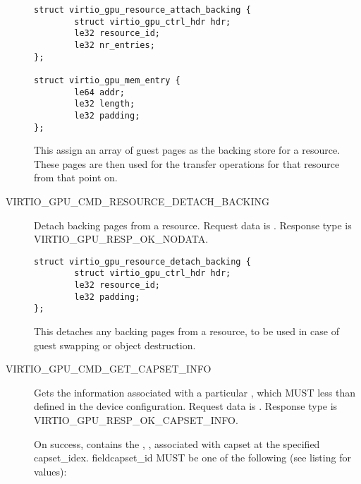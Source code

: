 \begin{description}
\begin{lstlisting}
struct virtio_gpu_resource_attach_backing {
        struct virtio_gpu_ctrl_hdr hdr;
        le32 resource_id;
        le32 nr_entries;
};

struct virtio_gpu_mem_entry {
        le64 addr;
        le32 length;
        le32 padding;
};
\end{lstlisting}

This assign an array of guest pages as the backing store for a
resource. These pages are then used for the transfer operations for
that resource from that point on.

\item[VIRTIO_GPU_CMD_RESOURCE_DETACH_BACKING] Detach backing pages
  from a resource.  Request data is .  Response type is
  VIRTIO_GPU_RESP_OK_NODATA.

\begin{lstlisting}
struct virtio_gpu_resource_detach_backing {
        struct virtio_gpu_ctrl_hdr hdr;
        le32 resource_id;
        le32 padding;
};
\end{lstlisting}

This detaches any backing pages from a resource, to be used in case of
guest swapping or object destruction.

\item[VIRTIO_GPU_CMD_GET_CAPSET_INFO] Gets the information associated with
  a particular , which MUST less than 
  defined in the device configuration.  Request data is
  .  Response type is
  VIRTIO_GPU_RESP_OK_CAPSET_INFO.

  On success,  contains the
  , , 
  associated with capset at the specified {capset_idex}.  field{capset_id} MUST
  be one of the following (see listing for values):


\end{description}
